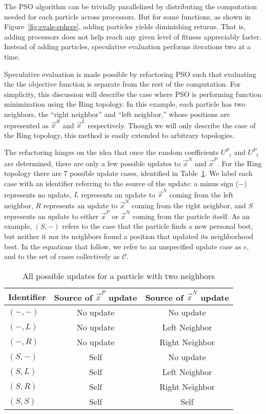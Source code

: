 \documentclass{llncs}
\newcommand{\fig}[1]{Figure~\ref{fig:#1}}
\providecommand{\pers}{\ensuremath{P}}
\providecommand{\neigh}{\ensuremath{N}}
\providecommand{\leftind}{\ensuremath{L}}
\providecommand{\rightind}{\ensuremath{R}}
\providecommand{\pURand}{\ensuremath{U^\pers}}
\providecommand{\nbest}{\ensuremath{\Vec{x}^\neigh}}
\providecommand{\pbest}{\ensuremath{\Vec{x}^\pers}}
\providecommand{\leftn}{\ensuremath{\Vec{x}^\leftind}}
\providecommand{\rightn}{\ensuremath{\Vec{x}^\rightind}}
\providecommand{\caseset}{\ensuremath{\mathcal{C}}}
\providecommand{\casegen}{\ensuremath{c}}
\providecommand{\casexn}{\ensuremath{(S,-)}}
\providecommand{\casexx}{\ensuremath{(S,S)}}
\providecommand{\casexl}{\ensuremath{(S,\leftind)}}
\providecommand{\casexr}{\ensuremath{(S,\rightind)}}
\providecommand{\casepn}{\ensuremath{(-,-)}}
\providecommand{\casepl}{\ensuremath{(-,\leftind)}}
\providecommand{\casepr}{\ensuremath{(-,\rightind)}}
\begin{document}
The PSO algorithm can be trivially parallelized by distributing the computation
needed for each particle across processors.  But
for some functions, as shown in \fig{evals-sphere},
adding particles yields diminishing returns.
That is, adding processors does not help reach any given level of fitness
appreciably faster.  Instead of adding particles, speculative
evaluation performs iterations two at a time.

Speculative evaluation is made possible by refactoring
PSO such that evaluating the
the objective function is separate from the rest of the computation.  For
simplicity, this discussion will describe the case where PSO is performing
function minimization using the Ring topology.  In this example, each particle
has two neighbors, the ``right neighbor'' and ``left neighbor,'' whose
positions are represented as $\rightn$ and $\leftn$ respectively.  Though we
will only describe the case of the Ring topology, this method is easily
extended to arbitrary topologies.

The refactoring hinges on the idea that once the random coefficients $\pURand_{t}$ and $\pURand_{t}$ are
determined, there are only a few possible updates to $\nbest$ and $\pbest$.
For the Ring topology there are 7 possible update cases, identified in
Table~\ref{tab:evals}.  We label each case with an identifier referring to the
source of the update: a minus sign ($-$) represents no update, $L$ represents
an update to $\nbest$ coming from the left neighbor, $R$ represents an update
to $\nbest$ coming from the right neighbor, and $S$ represents an update to
either $\pbest$ or $\nbest$ coming from the particle itself.  As an example,
$\casexn$ refers to the case that the particle finds a new personal best, but
neither it nor its neighbors found a position that updated its neighborhood
best.  In the equations that follow, we refer to an unspecified update case as
$\casegen$, and to the set of cases collectively as $\caseset$.

\begin{table}
  \caption{All possible updates for a particle with two neighbors}
  \label{tab:evals}
  \centering
  \begin{tabular}{lcc}
	Identifier&Source of $\pbest$ update&Source of $\nbest$ update\\
	\hline
	\hline
	$\casepn$&No update&No update\\
	\hline
	$\casepl$&No update&Left Neighbor\\
	\hline
	$\casepr$&No update&Right Neighbor\\
	\hline
	$\casexn$&Self&No update\\
	\hline
	$\casexl$&Self&Left Neighbor\\
	\hline
	$\casexr$&Self&Right Neighbor\\
	\hline
	$\casexx$&Self&Self\\
	\hline
  \end{tabular}
\end{table}
\end{document}
